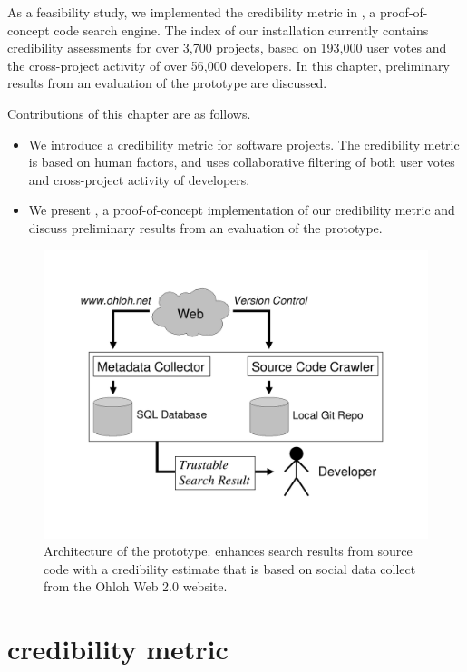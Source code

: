 \documentclass[10pt]{book}
\begin{document}
As a feasibility study, we implemented the credibility metric in \Jbd, a proof-of-concept code search engine. The index of our \Jbd installation currently contains credibility assessments for over 3,700 projects, based on 193,000 user votes and the cross-project activity of over 56,000 developers. In this chapter, preliminary results from an evaluation of the prototype are discussed.

Contributions of this chapter are as follows.
\begin{itemize}
\item We introduce a credibility metric for software projects. The credibility metric is based on human factors, and uses collaborative filtering of both user votes and cross-project activity of developers.
\item We present \Jbd, a proof-of-concept implementation of our credibility metric and discuss preliminary results from an evaluation of the prototype.
\end{itemize}

\begin{figure}
  \centering
    \includegraphics[width=\linewidth]{bender-architecture-diagram}
    \caption{
    {\small
    Architecture of the \Jbd prototype. \Jbd enhances search results from source code with a credibility estimate that is based on social data collect from the Ohloh Web 2.0 website.
    }
    }
    \label{fig:archi}
\end{figure}
\section{credibility metric}
\label{sec:metric}
\end{document}
